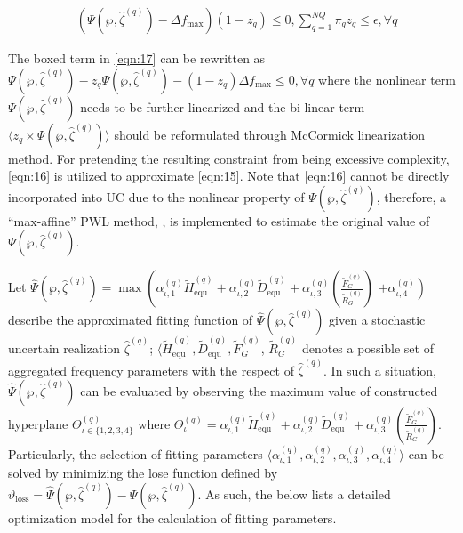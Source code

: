 \documentclass[lettersize,journal]{IEEEtran}
\begin{document}
\vspace{-0.125in}
\begin{small}
	\begin{align}\label{eqn:17}
		 & \boxed{\left(\Psi\!\left(\wp, \hat{\zeta}^{(q)}\!\right) \!- \!\varDelta f_{\text{max}} \right) \left(1-z_{q}\right) \leq 0},\sum\nolimits_{q=1}^{NQ} \pi_{q} z_{q}\! \leq \epsilon,\forall q
	\end{align}
\end{small}

The boxed term in \cref{eqn:17} can be rewritten as $\Psi\!(\wp, \hat{\zeta}^{(q)}\!) -  z_{q} \Psi\!(\wp, \hat{\zeta}^{(q)}\!) \!- \! (1\!\!-\!\!z_{q})\varDelta f_{\text{max}}\!\! \leq\!\! 0,\forall q$ where the nonlinear term $\Psi\!(\wp, \hat{\zeta}^{(q)})\!$ needs to be further linearized and the bi-linear term $\langle z_{q} \times \Psi\!(\wp, \hat{\zeta}^{(q)}\!)\rangle$ should be reformulated through McCormick linearization method. For pretending the resulting constraint from being excessive complexity, \eqref{eqn:16} is utilized to approximate \eqref{eqn:15}. Note that \eqref{eqn:16} cannot be directly incorporated into UC due to the nonlinear property of $\Psi\!(\wp, \hat{\zeta}^{(q)}\!)$, therefore, a ``max-affine'' PWL method, \cite{paturet2020stochastic,10219063,9765359}, is implemented to estimate the original value of $\Psi\!(\wp, \hat{\zeta}^{(q)}\!)$.

Let $\hat{\Psi}(\wp, \hat{\zeta}^{(q)}) \!=\!\max\left(\alpha_{\iota,1}^{(q)}\tilde{H}_{\text{equ}}^{(q)} + \alpha_{\iota,2}^{(q)} \tilde{D}_{\text{equ}}^{(q)} + \alpha_{\iota,3}^{(q)}\left(\frac{\tilde{F}_G^{(q)}}{\tilde{R}_G^{(q)} }\right)\right.$ $\left. + \alpha_{\iota,4}^{(q)} \right) $ describe the approximated fitting function of $\hat{\Psi}(\wp, \hat{\zeta}^{(q)})$ given a stochastic uncertain realization $\hat{\zeta}^{(q)}$; $\langle \tilde{H}_{\text{equ}}^{(q)}, \tilde{D}_{\text{equ}}^{(q)}, \tilde{F}_G^{(q)}$, $\tilde{R}_G^{(q)}$ denotes a possible set of aggregated frequency parameters with the respect of $\hat{\zeta}^{(q)}$. In such a situation, $\hat{\Psi}(\wp, \hat{\zeta}^{(q)})$ can be evaluated by observing the maximum value of constructed hyperplane $\Theta_{\iota\in\{1,2,3,4\}}^{(q)}$ where $\Theta_{\iota}^{(q)} = \alpha_{\iota,1}^{(q)}\tilde{H}_{\text{equ}}^{(q)} + \alpha_{\iota,2}^{(q)} \tilde{D}_{\text{equ}}^{(q)} + \alpha_{\iota,3}^{(q)}\left(\frac{\tilde{F}_G^{(q)}}{\tilde{R}_G^{(q)} }\right)$. Particularly, the selection of fitting parameters $\langle \alpha_{\iota, 1}^{(q)},\alpha_{\iota, 2}^{(q)}, \alpha_{\iota, 3}^{(q)}, \alpha_{\iota, 4}^{(q)}  \rangle$ can be solved by minimizing the lose function defined by $\vartheta_{\text{loss}} \!=\! \hat{\Psi}(\wp, \hat{\zeta}^{(q)}) \!-\! \Psi(\wp, \hat{\zeta}^{(q)})$. As such, the below lists a detailed optimization model for the calculation of fitting parameters.
\end{document}
